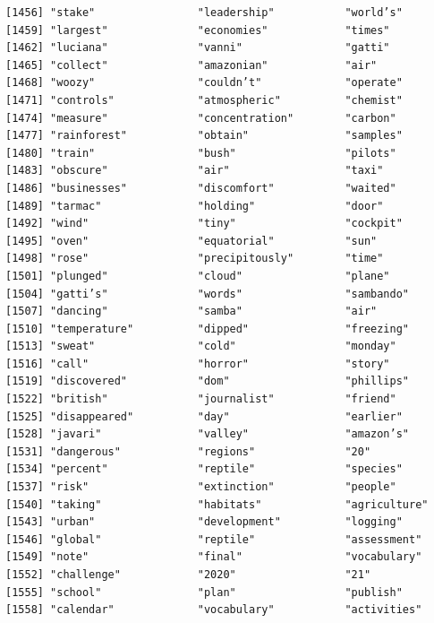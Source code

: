 \documentclass[
  letterpaper,
  DIV=11,
  numbers=noendperiod]{scrartcl}
\begin{document}
\begin{verbatim}
[1456] "stake"                "leadership"           "world’s"             
[1459] "largest"              "economies"            "times"               
[1462] "luciana"              "vanni"                "gatti"               
[1465] "collect"              "amazonian"            "air"                 
[1468] "woozy"                "couldn’t"             "operate"             
[1471] "controls"             "atmospheric"          "chemist"             
[1474] "measure"              "concentration"        "carbon"              
[1477] "rainforest"           "obtain"               "samples"             
[1480] "train"                "bush"                 "pilots"              
[1483] "obscure"              "air"                  "taxi"                
[1486] "businesses"           "discomfort"           "waited"              
[1489] "tarmac"               "holding"              "door"                
[1492] "wind"                 "tiny"                 "cockpit"             
[1495] "oven"                 "equatorial"           "sun"                 
[1498] "rose"                 "precipitously"        "time"                
[1501] "plunged"              "cloud"                "plane"               
[1504] "gatti’s"              "words"                "sambando"            
[1507] "dancing"              "samba"                "air"                 
[1510] "temperature"          "dipped"               "freezing"            
[1513] "sweat"                "cold"                 "monday"              
[1516] "call"                 "horror"               "story"               
[1519] "discovered"           "dom"                  "phillips"            
[1522] "british"              "journalist"           "friend"              
[1525] "disappeared"          "day"                  "earlier"             
[1528] "javari"               "valley"               "amazon’s"            
[1531] "dangerous"            "regions"              "20"                  
[1534] "percent"              "reptile"              "species"             
[1537] "risk"                 "extinction"           "people"              
[1540] "taking"               "habitats"             "agriculture"         
[1543] "urban"                "development"          "logging"             
[1546] "global"               "reptile"              "assessment"          
[1549] "note"                 "final"                "vocabulary"          
[1552] "challenge"            "2020"                 "21"                  
[1555] "school"               "plan"                 "publish"             
[1558] "calendar"             "vocabulary"           "activities"          

\end{verbatim}
\end{document}
